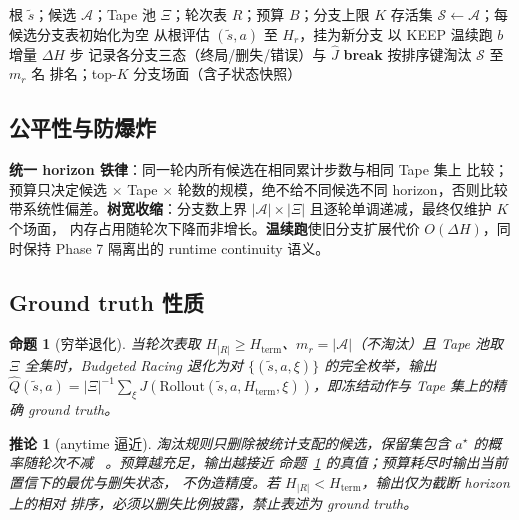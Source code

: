 \documentclass[11pt,a4paper]{article}
\newcommand{\racing}{Budgeted Racing}
\newtheorem{proposition}{命题}
\newtheorem{corollary}{推论}
\begin{document}
\begin{algorithm}[t]
\caption{\racing{}（逐轮淘汰候选竞赛）}
\label{alg:racing}
\begin{algorithmic}[1]
\REQUIRE 根 $\tilde{s}$；候选 $\mathcal{A}$；Tape 池 $\Xi$；轮次表 $R$；预算 $B$；分支上限 $K$
\STATE 存活集 $\mathcal{S} \leftarrow \mathcal{A}$；每候选分支表初始化为空
       \STATE 从根评估 $(\tilde{s}, a)$ 至 $H_r$，挂为新分支
    \ENDFOR
       \STATE 以 KEEP 温续跑 $b$ 增量 $\Delta H$ 步
    \ENDFOR
  \ENDFOR
  \STATE 记录各分支三态（终局/删失/错误）与 $\hat{J}$
     \STATE \textbf{break}
  \ENDIF
  \STATE 按排序键淘汰 $\mathcal{S}$ 至 $m_r$ 名
\ENDFOR
\ENSURE 排名；top-$K$ 分支场面（含子状态快照）
\end{algorithmic}
\end{algorithm}

\subsection{公平性与防爆炸}

\textbf{统一 horizon 铁律}：同一轮内所有候选在相同累计步数与相同 Tape 集上
比较；预算只决定候选 $\times$ Tape $\times$ 轮数的规模，绝不给不同候选不同
horizon，否则比较带系统性偏差。\textbf{树宽收缩}：分支数上界
$|\mathcal{A}| \times |\Xi|$ 且逐轮单调递减，最终仅维护 $K$ 个场面，
内存占用随轮次下降而非增长。\textbf{温续跑}使旧分支扩展代价
$O(\Delta H)$，同时保持 Phase 7 隔离出的 runtime continuity 语义。

\subsection{Ground truth 性质}

\begin{proposition}[穷举退化]
\label{prop:exact}
当轮次表取 $H_{|R|} \ge H_\text{term}$、$m_r = |\mathcal{A}|$（不淘汰）且
Tape 池取 $\Xi$ 全集时，\racing{} 退化为对
$\{(\tilde{s}, a, \xi)\}$ 的完全枚举，输出
$\hat{Q}(\tilde{s}, a) = |\Xi|^{-1} \sum_\xi J(\mathrm{Rollout}(\tilde{s}, a,
H_\text{term}, \xi))$，即冻结动作与 Tape 集上的精确 ground truth。
\end{proposition}

\begin{corollary}[anytime 逼近]
淘汰规则只删除被统计支配的候选，保留集包含 $a^\star$ 的概率随轮次不减
~\citep{maron1994hoeffding,karnin2013almost}。预算越充足，输出越接近
命题~\ref{prop:exact} 的真值；预算耗尽时输出当前置信下的最优与删失状态，
不伪造精度。若 $H_{|R|} < H_\text{term}$，输出仅为截断 horizon 上的相对
排序，必须以删失比例披露，禁止表述为 ground truth。
\end{corollary}
\end{document}
